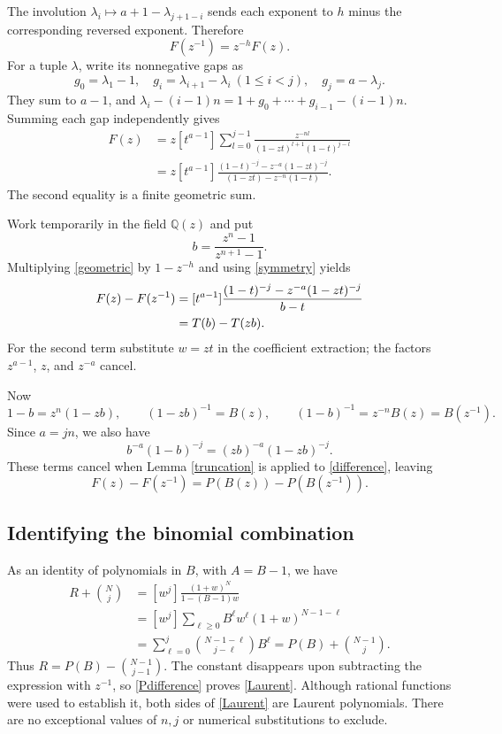 \documentclass[11pt]{article}
\begin{document}
The involution
$\lambda_i\mapsto a+1-\lambda_{j+1-i}$ sends each exponent
to $h$ minus the corresponding reversed exponent. Therefore
\begin{equation}\label{symmetry}
 F(z^{-1})=z^{-h}F(z).
\end{equation}
For a tuple $\lambda$, write its nonnegative gaps as
\[
 g_0=\lambda_1-1,\quad
 g_i=\lambda_{i+1}-\lambda_i\ (1\leq i<j),\quad
 g_j=a-\lambda_j.
\]
They sum to $a-1$, and
$\lambda_i-(i-1)n=1+g_0+\cdots+g_{i-1}-(i-1)n$.
Summing each gap independently gives
\begin{align}
 F(z)&=z[t^{a-1}]\sum_{l=0}^{j-1}
 \frac{z^{-nl}}{(1-zt)^{l+1}(1-t)^{j-l}}\label{gaps}\\
 &=z[t^{a-1}]
 \frac{(1-t)^{-j}-z^{-a}(1-zt)^{-j}}
      {(1-zt)-z^{-n}(1-t)}.\label{geometric}
\end{align}
The second equality is a finite geometric sum.

Work temporarily in the field $\mathbb Q(z)$ and put
\[
 b=\frac{z^n-1}{z^{n+1}-1}.
\]
Multiplying \eqref{geometric} by $1-z^{-h}$ and using
\eqref{symmetry} yields
\begin{align}
 F(z)-F(z^{-1})
 &=[t^{a-1}]\frac{(1-t)^{-j}-z^{-a}(1-zt)^{-j}}{b-t}
 \notag\\
 &=T(b)-T(zb).\label{difference}
\end{align}
For the second term substitute $w=zt$ in the coefficient
extraction; the factors $z^{a-1}$, $z$, and $z^{-a}$ cancel.

Now
\[
 1-b=z^n(1-zb),\qquad
 (1-zb)^{-1}=B(z),\qquad
 (1-b)^{-1}=z^{-n}B(z)=B(z^{-1}).
\]
Since $a=jn$, we also have
\[
 b^{-a}(1-b)^{-j}=(zb)^{-a}(1-zb)^{-j}.
\]
These terms cancel when Lemma \ref{truncation} is applied to
\eqref{difference}, leaving
\begin{equation}\label{Pdifference}
 F(z)-F(z^{-1})=P(B(z))-P(B(z^{-1})).
\end{equation}

\subsection*{Identifying the binomial combination}
As an identity of polynomials in $B$, with $A=B-1$, we have
\begin{align*}
 R+\binom Nj
 &=[w^j]\frac{(1+w)^N}{1-(B-1)w}\\
 &=[w^j]\sum_{\ell\geq0}B^\ell w^\ell(1+w)^{N-1-\ell}\\
 &=\sum_{\ell=0}^j\binom{N-1-\ell}{j-\ell}B^\ell
  =P(B)+\binom{N-1}j.
\end{align*}
Thus $R=P(B)-\binom{N-1}{j-1}$. The constant disappears upon
subtracting the expression with $z^{-1}$, so
\eqref{Pdifference} proves \eqref{Laurent}. Although rational
functions were used to establish it, both sides of
\eqref{Laurent} are Laurent polynomials. There are no exceptional
values of $n,j$ or numerical substitutions to exclude.
\end{document}
